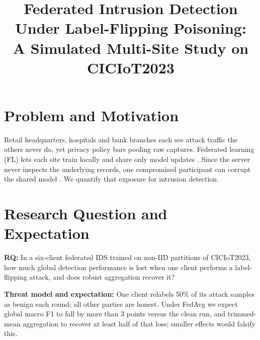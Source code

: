 \documentclass[conference]{IEEEtran}
\begin{document}
\title{Federated Intrusion Detection Under Label-Flipping Poisoning:\\
A Simulated Multi-Site Study on CICIoT2023}

\author{
}

\maketitle

\section{Problem and Motivation}
Retail headquarters, hospitals and bank branches each see attack traffic the
others never do, yet privacy policy bars pooling raw captures.
Federated learning (FL) lets each site train locally and share only model
updates \cite{mcmahan2017}. Since the server never inspects the underlying
records, one compromised participant can corrupt the shared model
\cite{tolpegin2020}. We quantify that exposure for intrusion detection.

\section{Research Question and Expectation}
\textbf{RQ:} In a six-client federated IDS trained on non-IID partitions of
CICIoT2023, how much global detection performance is lost when one client
performs a label-flipping attack, and does robust aggregation recover it?

\textbf{Threat model and expectation:} One client relabels 50\% of its attack
samples as benign each round; all other parties are honest. Under FedAvg we expect
global macro F1 to fall by more than 3 points versus the clean run, and
trimmed-mean aggregation \cite{yin2018} to recover at least half of that loss;
smaller effects would falsify this.
\end{document}
